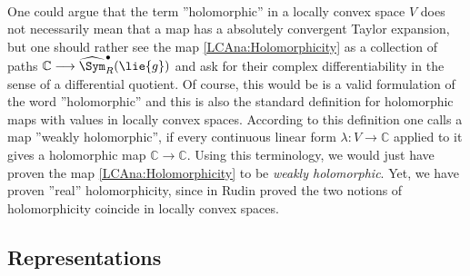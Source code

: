 \begin{remark}
	\label{LCAna:Rem:Holomorphicity} \hfill \\
	One could argue that the term ''holomorphic'' in a locally convex space 
	$V$ does not necessarily mean that a map has a absolutely convergent 
	Taylor expansion, but one should rather see the map 
	\eqref{LCAna:Holomorphicity} as a collection of paths $\mathbb{C} 
	\longrightarrow \widehat{\Sym}_R^{\bullet}(\lie{g})$ and ask for their 
	complex differentiability in the sense of a differential quotient. Of 
	course, this would be is a valid formulation of the word ''holomorphic'' 
	and this is also the standard definition for holomorphic maps with values 
	in locally convex spaces. According to this definition one calls a map 
	''weakly holomorphic'', if every continuous linear form 
	$\lambda \colon V \longrightarrow \mathbb{C}$ applied to it gives a 
	holomorphic map $\mathbb{C} \longrightarrow \mathbb{C}$. Using this 
	terminology, we would just have proven the map 
	\eqref{LCAna:Holomorphicity} to be \emph{weakly holomorphic}. Yet, we have 
	proven ''real'' holomorphicity, since in \cite[Theorem 3.31]{rudin:1991a} 
	Rudin proved the two notions of holomorphicity coincide in locally convex 
	spaces.
\end{remark}



\subsection{Representations}

